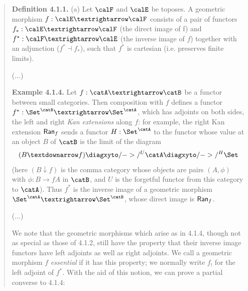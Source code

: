 \documentclass[oneside,12pt]{article}
\begin{document}
\begin{quotation}


  {\bf Definition 4.1.1.} (a) Let $\calF$ and $\calE$ be toposes. A
  geometric morphism $f: \calE → \calF$ consists of a pair of functors
  $f_*: \calE → \calF$ (the direct image of f) and $f^*: \calF →
  \calE$ (the inverse image of $f$) together with an adjunction ($f^*
  ⊣ f_*$), such that $f^*$ is cartesian (i.e. preserves finite
  limits).

  \msk

  (...)

  \msk


  {\bf Example 4.1.4.} Let $f: \catA → \catB$ be a functor between
  small categories. Then composition with $f$ defines a functor $f^*:
  \Set^\catB→\Set^\catA$, which has adjoints on both sides, the left
  and right {\sl Kan extensions} along $f$: for example, the right Kan
  extension $\mathsf{Ran}_f$ sends a functor $H: \Set^\catA$ to the functor
  whose value at an object $B$ of $\catB$ is the limit of the diagram
  $$ (B ↓ f) \diagxyto/->/^U \catA \diagxyto/->/^H \Set $$
  (here $(B ↓ f)$ is the comma category whose objects are pairs
  $(A,ϕ)$ with $ϕ:B→fA$ in $\catB$, and $U$ is the forgetful functor
  from this category to $\catA$). Thus $f^*$ is the inverse image of a
  geometric morphism $\Set^\catA → \Set^\catB$, whose direct image is
  $\mathsf{Ran}_f$.

  \msk

  (...)

  \msk


  We note that the geometric morphisms which arise as in 4.1.4, though
  not as special as those of 4.1.2, still have the property that their
  inverse image functors have left adjoints as well as right adjoints.
  We call a geometric morphism $f$ {\it essential} if it has this
  property; we normally write $f_!$ for the left adjoint of $f^*$.
  With the aid of this notion, we can prove a partial converse to
  4.1.4:


\end{quotation}
\end{document}
